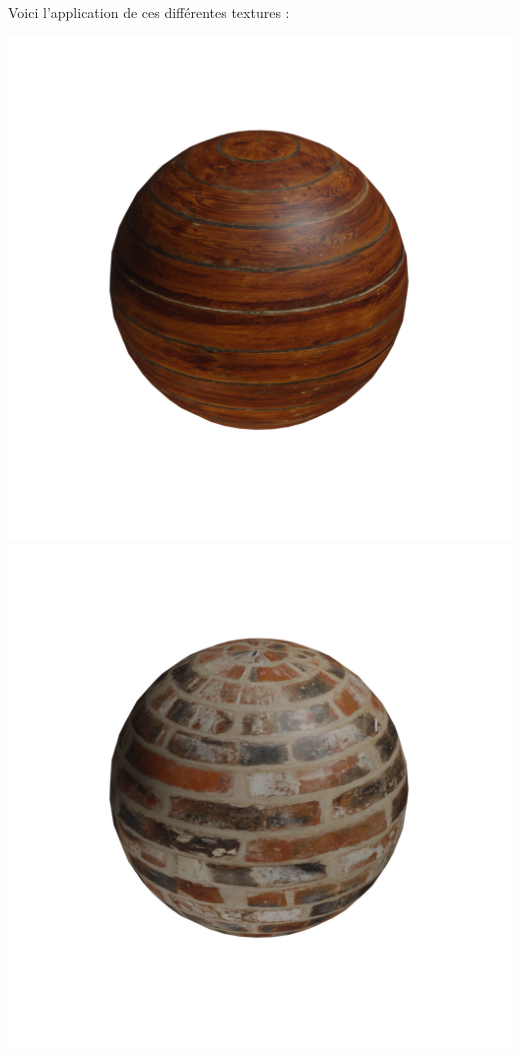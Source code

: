 \documentclass[11pt,class=report,crop=false]{standalone}
\begin{document}
Voici l'application de ces différentes textures :
\begin{center}
\includegraphics[scale=\myscale,scale=0.15,trim={3cm 7cm 3cm 7cm},clip]{figures/texture-sphere-wood}
\includegraphics[scale=\myscale,scale=0.15,trim={3cm 7cm 3cm 7cm},clip]{figures/texture-sphere-brick}

\end{center}
\end{document}
